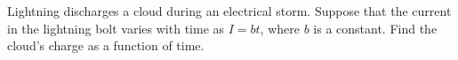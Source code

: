 Lightning discharges a cloud during an electrical storm. Suppose
        that the current in the lightning bolt varies with time as $I=bt$, where
         $b$ is a constant. Find the cloud's charge as a function of time.
        \answercheck
